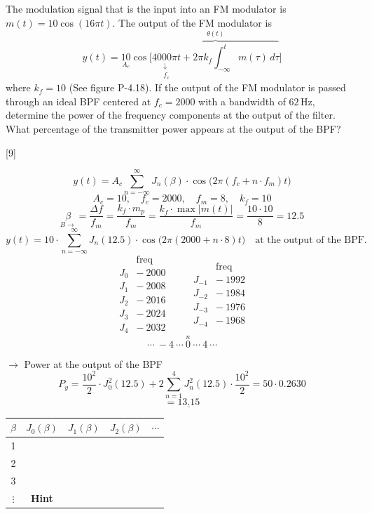 \documentclass[11pt,a4paper]{article}
\begin{document}
\begin{ornek}[4.18 (FM)]
The modulation signal that is the input into an FM modulator is $m(t)=10\cos(16\pi t)$. The output of the FM modulator is
\[ y(t)=\underset{A_c}{10}\cos\Big[\overbrace{\underset{\substack{\downarrow\\ f_c}}{4000\pi t}+2\pi k_f\int_{-\infty}^{t}m(\tau)\,d\tau}^{\theta(t)}\Big] \]
where $k_f=10$ (See figure P-4.18). If the output of the FM modulator is passed through an ideal BPF centered at $f_c=2000$ with a bandwidth of $62\,\mathrm{Hz}$, determine the power of the frequency components at the output of the filter. What percentage of the transmitter power appears at the output of the BPF?
\end{ornek}
[9]

\[ y(t)=A_c\sum_{n=-\infty}^{\infty}J_n(\beta)\cdot\cos\big(2\pi(f_c+n\cdot f_m)t\big) \]
\[ A_c=10,\quad f_c=2000,\quad f_m=8,\quad k_f=10 \]
\[ \underset{B\rightarrow}{\beta}=\frac{\Delta f}{f_m}=\frac{k_f\cdot m_p}{f_m}=\frac{k_f\cdot\max|m(t)|}{f_m}=\frac{10\cdot10}{8}=12.5 \]
\[ y(t)=10\cdot\sum_{n=-\infty}^{\infty}J_n(12.5)\cdot\cos\big(2\pi(2000+n\cdot8)t\big)\quad\text{at the output of the BPF.} \]
\[ \begin{array}{ll} & \text{freq}\\ J_0 & -\ 2000\\ J_1 & -\ 2008\\ J_2 & -\ 2016\\ J_3 & -\ 2024\\ J_4 & -\ 2032 \end{array}\qquad \begin{array}{ll} & \text{freq}\\ J_{-1} & -\ 1992\\ J_{-2} & -\ 1984\\ J_{-3} & -\ 1976\\ J_{-4} & -\ 1968 \end{array} \]
\[ \cdots\ -4\ \cdots\ \overset{n}{0}\ \cdots\ 4\ \cdots \]

\noindent$\rightarrow$ Power at the output of the BPF
\[ P_y=\frac{10^2}{2}\cdot J_0^2(12.5)+2\sum_{n=1}^{4}J_n^2(12.5)\cdot\frac{10^2}{2}=50\cdot0.2630 \]
\[ =\underline{13.15} \]
\begin{center}
\begin{tabular}{c|cccc}
$\beta$ & $J_0(\beta)$ & $J_1(\beta)$ & $J_2(\beta)$ & $\cdots$\\ \hline
1 & & & &\\
2 & & & &\\
3 & & & &\\
$\vdots$ & \textbf{Hint} & & &
\end{tabular}
\end{center}
\end{document}
